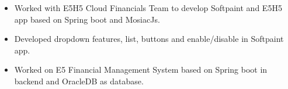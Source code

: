 \documentclass[10pt,a4paper,ragged2e]{altacv}
\begin{document}


\begin{fullwidth}
\makecvheader
\end{fullwidth}




\begin{itemize}

\item Worked with E5H5 Cloud Financials Team to develop Softpaint and E5H5 app based on Spring boot and MosiacJs.
\item Developed dropdown features, list, buttons and enable/disable in Softpaint app.
\item Worked on E5 Financial Management System based on Spring boot in backend and OracleDB as database.

\end{itemize}
\divider
\end{document}
